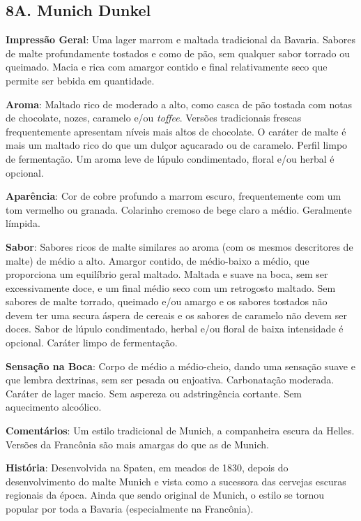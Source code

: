 \subsection*{8A. Munich Dunkel}
\textbf{Impressão Geral}: Uma lager marrom e maltada tradicional da Bavaria. Sabores de malte profundamente tostados e como de pão, sem qualquer sabor torrado ou queimado. Macia e rica com amargor contido e final relativamente seco que permite ser bebida em quantidade.

\textbf{Aroma}: Maltado rico de moderado a alto, como casca de pão tostada com notas de chocolate, nozes, caramelo e/ou \textit{toffee}. Versões tradicionais frescas frequentemente apresentam níveis mais altos de chocolate. O caráter de malte é mais um maltado rico do que um dulçor açucarado ou de caramelo. Perfil limpo de fermentação. Um aroma leve de lúpulo condimentado, floral e/ou herbal é opcional.

\textbf{Aparência}: Cor de cobre profundo a marrom escuro, frequentemente com um tom vermelho ou granada. Colarinho cremoso de bege claro a médio. Geralmente límpida.

\textbf{Sabor}: Sabores ricos de malte similares ao aroma (com os mesmos descritores de malte) de médio a alto. Amargor contido, de médio-baixo a médio, que proporciona um equilíbrio geral maltado. Maltada e suave na boca, sem ser excessivamente doce, e um final médio seco com um retrogosto maltado. Sem sabores de malte torrado, queimado e/ou amargo e os sabores tostados não devem ter uma secura áspera de cereais e os sabores de caramelo não devem ser doces. Sabor de lúpulo condimentado, herbal e/ou floral de baixa intensidade é opcional. Caráter limpo de fermentação.

\textbf{Sensação na Boca}: Corpo de médio a médio-cheio, dando uma sensação suave e que lembra dextrinas, sem ser pesada ou enjoativa. Carbonatação moderada. Caráter de lager macio. Sem aspereza ou adstringência cortante. Sem aquecimento alcoólico.

\textbf{Comentários}: Um estilo tradicional de Munich, a companheira escura da Helles. Versões da Francônia são mais amargas do que as de Munich.

\textbf{História}: Desenvolvida na Spaten, em meados de 1830, depois do desenvolvimento do malte Munich e vista como a sucessora das cervejas escuras regionais da época. Ainda que sendo original de Munich, o estilo se tornou popular por toda a Bavaria (especialmente na Francônia).

